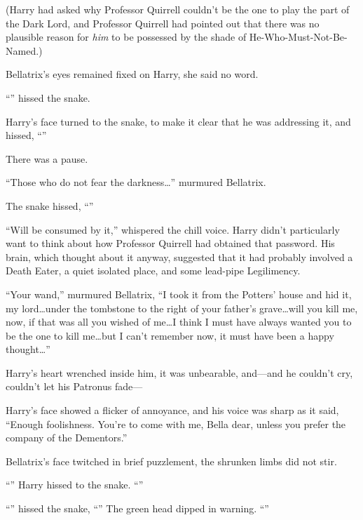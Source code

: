 (Harry had asked why Professor Quirrell couldn’t be the one to play the part of the Dark Lord, and Professor Quirrell had pointed out that there was no plausible reason for \emph{him} to be possessed by the shade of He-Who-Must-Not-Be-Named.)

Bellatrix’s eyes remained fixed on Harry, she said no word.

“” hissed the snake.

Harry’s face turned to the snake, to make it clear that he was addressing it, and hissed, “”

There was a pause.

“Those who do not fear the darkness…” murmured Bellatrix.

The snake hissed, “”

“Will be consumed by it,” whispered the chill voice. Harry didn’t particularly want to think about how Professor Quirrell had obtained that password. His brain, which thought about it anyway, suggested that it had probably involved a Death Eater, a quiet isolated place, and some lead-pipe Legilimency.

“Your wand,” murmured Bellatrix, “I took it from the Potters’ house and hid it, my lord…under the tombstone to the right of your father’s grave…will you kill me, now, if that was all you wished of me…I think I must have always wanted you to be the one to kill me…but I can’t remember now, it must have been a happy thought…”

Harry’s heart wrenched inside him, it was unbearable, and—and he couldn’t cry, couldn’t let his Patronus fade—

Harry’s face showed a flicker of annoyance, and his voice was sharp as it said, “Enough foolishness. You’re to come with me, Bella dear, unless you prefer the company of the Dementors.”

Bellatrix’s face twitched in brief puzzlement, the shrunken limbs did not stir.

“” Harry hissed to the snake. “”

“” hissed the snake, “” The green head dipped in warning. “”


